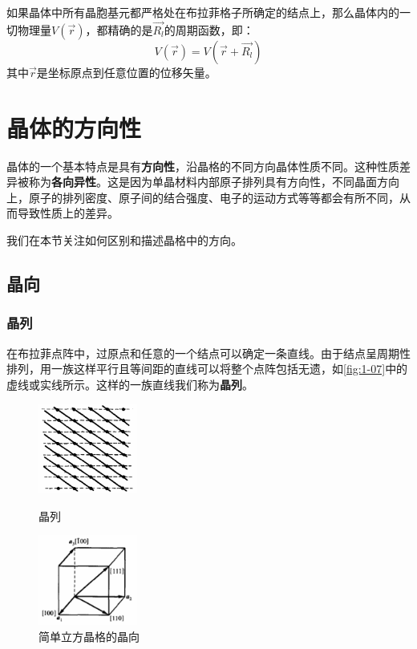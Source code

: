     如果晶体中所有晶胞基元都严格处在布拉菲格子所确定的结点上，那么晶体内的一切物理量$V(\vec{r})$，都精确的是$\vec{R_l}$的周期函数，即：
    \[
        V(\vec{r})=V(\vec{r}+\vec{R_l})
    \]
    其中$\vec{r}$是坐标原点到任意位置的位移矢量。

\section{晶体的方向性}
    晶体的一个基本特点是具有\textbf{方向性}，沿晶格的不同方向晶体性质不同。这种性质差异被称为\textbf{各向异性}。这是因为单晶材料内部原子排列具有方向性，不同晶面方向上，原子的排列密度、原子间的结合强度、电子的运动方式等等都会有所不同，从而导致性质上的差异。

    我们在本节关注如何区别和描述晶格中的方向。
\subsection{晶向}
\subsubsection{晶列}
    在布拉菲点阵中，过原点和任意的一个结点可以确定一条直线。由于结点呈周期性排列，用一族这样平行且等间距的直线可以将整个点阵包括无遗，如\autoref{fig:1-07}中的虚线或实线所示。这样的一族直线我们称为\textbf{晶列}。

    \begin{figure}[!htbp]
        \centering
        \begin{minipage}[t]{0.45\linewidth}
            \centering    
            \includegraphics[height=8em, keepaspectratio=true]{pic/1-28}
            \caption{晶列}
            \label{fig:1-07}
        \end{minipage}
        \hfill
        \begin{minipage}[t]{0.45\linewidth}
            \centering
            \includegraphics[height=8em, keepaspectratio=true]{pic/1-29}
            \caption{简单立方晶格的晶向}
            \label{fig:1-08}
        \end{minipage}
    \end{figure}
    
